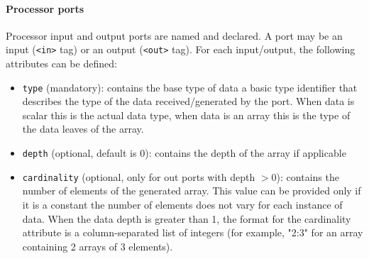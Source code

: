 \paragraph{Processor ports} 
Processor input and output ports are named and declared. A port may be an input
(\texttt{<in>} tag) or an output (\texttt{<out>} tag). For each input/output, the
following attributes can be defined:
\begin{itemize}
\item \texttt{type} (mandatory): contains the base type of data \ie a basic
type identifier that describes the type of the data received/generated by the
  port. When data is scalar this is the actual data type, when data is an array
  this is the type of the data leaves of the array.
\item \texttt{depth} (optional, default is 0): contains the depth of the array
  if applicable
\item \texttt{cardinality} (optional, only for out ports with depth $>0$):
  contains the number of elements of the generated array. This value can be
  provided only if it is a constant \ie the number of elements does not vary
  for each instance of data. When the data depth is greater than 1, the format
  for the cardinality attribute is a column-separated list of integers (for
  example, "2:3" for an array containing 2 arrays of 3 elements).
\end{itemize}

